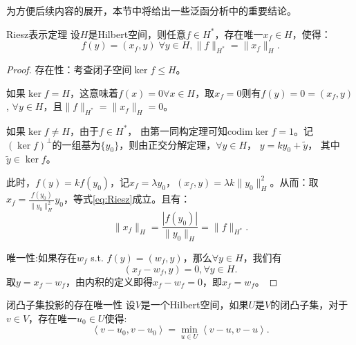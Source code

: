 \documentclass[lang=cn,10pt,newtx]{elegantbook}
\newcommand{\innerprod}[2]{\left<#1,#2\right>}
\newcommand{\norm}[1]{\|#1\|}
\begin{document}
为方便后续内容的展开，本节中将给出一些泛函分析中的重要结论。
\begin{proposition}{Riesz表示定理}
  \label{thm:Riesz}
  设$H$是Hilbert空间，则任意$f\in H^{*}$，存在唯一$x_{f}\in H$，使得：
  \begin{equation}
    \label{eq:Riesz}
    f(y)=(x_{f},y)\;\forall y\in H,\norm{f}_{H^{*}}=\norm{x_{f}}_{H}.
  \end{equation}
\end{proposition}
\begin{proof}
  存在性：考查闭子空间$\ker f\le H$。

  如果$\ker f=H$，这意味着$f(x)=0\forall x\in H$，取$x_{f}=0$则有$f(y)=0=(x_{f},y)$, $\forall y\in H$，且$\norm{f}_{H^{*}}=\norm{x_{f}}_{H}=0$。

  如果$\ker f\neq H$，由于$f\in H^{*}$， 由第一同构定理可知$\text{codim}\ker f=1$。记$(\ker f)^{\perp}$的一组基为$\{y_{0}\}$，则由正交分解定理，$\forall y\in H$， $y=ky_{0}+\tilde{y}$， 其中$\tilde{y}\in \ker f$。
  
  此时，$f(y)=kf(y_{0})$，记$x_{f}=\lambda y_{0}$，$(x_{f},y)=\lambda k\norm{y_{0}}_{H}^{2}$。从而：取$x_{f}=\frac{f(y_{0})}{\norm{y_{0}}_{H}^{2}}y_{0}$，等式\eqref{eq:Riesz}成立。且有：
  \begin{equation}
    \label{eq:normeq}
    \norm{x_{f}}_{H}=\frac{|f(y_{0})|}{\norm{y_{0}}_{H}}=\norm{f}_{H^{*}}.
  \end{equation}

  唯一性:如果存在$w_{f}$ s.t. $f(y)=(w_{f},y)$，那么$\forall y\in H$，我们有
  \begin{equation}
    (x_{f}-w_{f},y)=0,\forall y\in H.
  \end{equation} 
  取$y=x_{f}-w_{f}$，由内积的定义即得$x_{f}-w_{f}=0$，即$x_{f}=w_{f}$。
\end{proof}
\begin{proposition}{闭凸子集投影的存在唯一性}
  \label{thm:projection}
  设$V$是一个Hilbert空间，如果$U$是$V$的闭凸子集，对于$v\in V$，存在唯一$u_{0}\in U$使得:
  \begin{equation}
    \label{eq:uniqueproj}
    \innerprod{v-u_{0}}{v-u_{0}}=\min_{u\in U}\innerprod{v-u}{v-u}.
  \end{equation}
\end{proposition}
\end{document}
